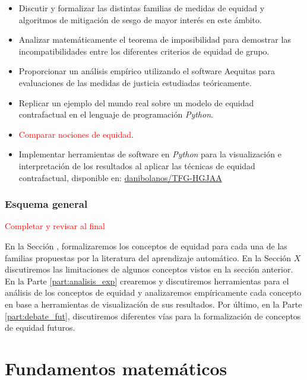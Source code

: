 \documentclass[oneside,openright,titlepage,numbers=noenddot,openany,headinclude,footinclude=true,
cleardoublepage=empty,abstractoff,BCOR=5mm,paper=a4,fontsize=12pt,main=spanish]{scrreprt}
\begin{document}
\begin{itemize}
    \item Discutir y formalizar las distintas familias de medidas de equidad y algoritmos de mitigación de sesgo de mayor interés en este ámbito.
    \item Analizar matemáticamente el teorema de imposibilidad para demostrar las incompatibilidades entre los diferentes criterios de equidad de grupo.
    \item Proporcionar un análisis empírico utilizando el software Aequitas para evaluaciones de las medidas de justicia estudiadas teóricamente.
    \item Replicar un ejemplo del mundo real sobre un modelo de equidad contrafactual en el lenguaje de programación \textit{Python}.
    \item \textcolor{red}{Comparar nociones de equidad}.
    \item Implementar herramientas de software en \textit{Python} para la visualización e interpretación de los resultados al aplicar las técnicas de equidad contrafactual, disponible en: \href{https://github.com/danibolanos/TFG-HGJAA.git}{danibolanos/TFG-HGJAA}
\end{itemize}

\section{Esquema general}

\textcolor{red}{Completar y revisar al final}

En la Sección , formalizaremos los conceptos de equidad para cada una de las familias propuestas por la literatura del aprendizaje automático. En la Sección $X$ discutiremos las limitaciones de algunos conceptos vistos en la sección anterior. En la Parte \ref{part:analisis_exp} crearemos y discutiremos herramientas para el análisis de los conceptos de equidad y analizaremos empíricamente cada concepto en base a herramientas de visualización de sus resultados. Por último, en la Parte \ref{part:debate_fut}, discutiremos diferentes vías para la formalización de conceptos de equidad futuros.

\part{Fundamentos matemáticos}
\end{document}
